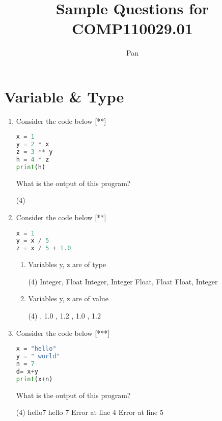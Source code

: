 \documentclass[11pt]{amsart}
\title{Sample Questions for COMP110029.01}
\author{Pan}
\date{}                                           %
\begin{document}
\section{Variable \& Type}


\begin{enumerate}
\item Consider the code below [**]
\begin{lstlisting}[language=Python]
x = 1
y = 2 * x
z = 3 ** y
h = 4 * z
print(h)
\end{lstlisting}
What is the output of this program?
	\begin{tasks}(4)
	\end{tasks}
\item Consider the code below [**]
\begin{lstlisting}[language=Python]
x = 1
y = x / 5
z = x / 5 + 1.0
\end{lstlisting}
	\begin{enumerate}
	\item Variables y, z are of type 
		\begin{tasks}(4)
			\task Integer, Float
			\task Integer, Integer
			\task Float, Float
			\task Float, Integer
		\end{tasks}
	
	\item Variables y, z are of value 
			\begin{tasks}(4)
			\task 0, 1.0
			\task 0.2, 1.2
			\task 0.2, 1.0
			\task 0, 1.2
		\end{tasks}
	\end{enumerate}
\item Consider the code below [***]
\begin{lstlisting}[language=Python]
x = "hello"
y = " world"
n = 7
d= x+y
print(x+n)
\end{lstlisting}
What is the output of this program?
	\begin{tasks}(4)
		\task hello7
		\task hello 7
		\task Error at line 4
		\task Error at line 5
	\end{tasks}
\end{enumerate}
\end{document}
